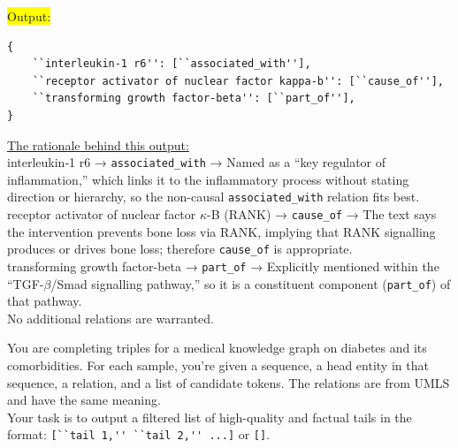 \documentclass[10pt]{article}
\newcommand{\ours}{\textsc{GraphMERT}\xspace}
\begin{document}
\begin{appendices}
\begin{tcolorbox}
\colorbox{Yellow}{Output:}
\begin{verbatim}
{
    ``interleukin‐1 r6'': [``associated_with''],
    ``receptor activator of nuclear factor kappa‐b'': [``cause_of''],
    ``transforming growth factor‐beta'': [``part_of''],
}
\end{verbatim}

\vspace{\baselineskip}
\underline{The rationale behind this output:}\\

interleukin‐1 r6 → \verb|associated_with| → Named as a “key regulator of inflammation,” which links it to the inflammatory process without stating direction or hierarchy, so the non-causal \verb|associated_with| relation fits best.\\

receptor activator of nuclear factor $\kappa$-B (RANK) → \verb|cause_of| → The text says the intervention prevents bone loss via RANK, implying that RANK signalling produces or drives bone loss; therefore \verb|cause_of| is appropriate.\\

transforming growth factor-beta → \verb|part_of| → Explicitly mentioned within the “TGF-$\beta$/Smad signalling pathway,” so it is a constituent component (\verb|part_of|) of that pathway.\\

No additional relations are warranted.  

\vspace{\baselineskip}

\end{tcolorbox}

\begin{tcolorbox}[
    title=Combining \ours-predicted Top Tokens Prompt,
    halign title=center,
    colback=white,
    colframe=blue,
    breakable,
    boxrule=0.8pt,
    arc=4mm,
    left=4pt,
    right=4pt,
    top=4pt,
    bottom=4pt,
    fontupper=\small
]

You are completing triples for a medical knowledge graph on diabetes and its comorbidities. For each sample, you're given a sequence, a head entity in that sequence, a relation, and a list of candidate tokens. The relations are from UMLS and have the same meaning.\\[2pt]

Your task is to output a filtered list of high-quality and factual tails in the format: \verb|[``tail 1,'' ``tail 2,'' ...]| or \verb|[]|.\\[4pt]


\end{tcolorbox}
\end{appendices}
\end{document}
